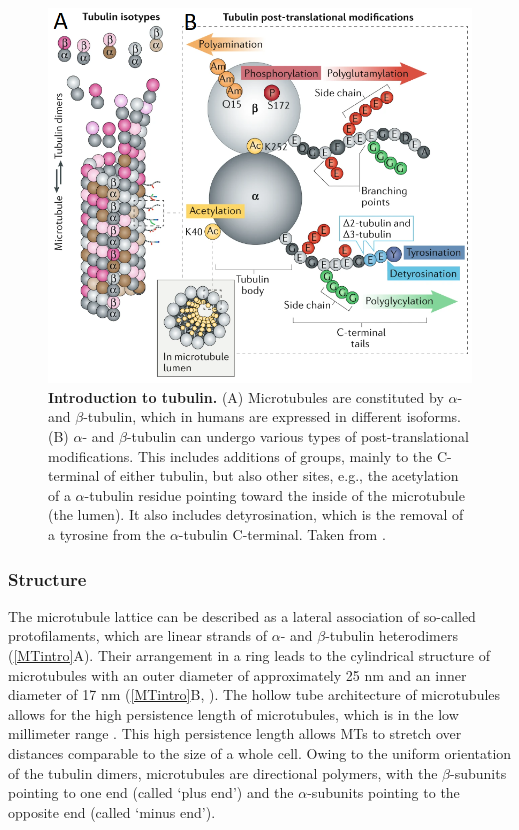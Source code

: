 \begin{figure}[h!tb]
	\centering
	\includegraphics[width=0.6\linewidth]{Figures/tubcode.png}
	\caption[Introduction to tubulin.]{\textbf{Introduction to tubulin.}
	(A) Microtubules are constituted by $\alpha$- and $\beta$-tubulin, which in humans are expressed in different isoforms. (B) $\alpha$- and $\beta$-tubulin can undergo various types of post-translational modifications. This includes additions of groups, mainly to the C-terminal of either tubulin, but also other sites, e.g., the acetylation of a $\alpha$-tubulin residue pointing toward the inside of the microtubule (the lumen). It also includes detyrosination, which is the removal of a tyrosine from the $\alpha$-tubulin C-terminal. Taken from \cite{Janke2020}.
		}\label{tubcode}
\end{figure}

\subsubsection{Structure}
The microtubule lattice can be described as a lateral association of so-called protofilaments, which are linear strands of $\alpha$- and $\beta$-tubulin heterodimers (\autoref{MTintro}A). Their arrangement in a ring leads to the cylindrical structure of microtubules with an outer diameter of approximately 25 nm and an inner diameter of 17 nm (\autoref{MTintro}B, ). The hollow tube architecture of microtubules allows for the high persistence length of microtubules, which is in the low millimeter range \parencite{Hawkins2010}. This high persistence length allows MTs to stretch over distances comparable to the size of a whole cell. Owing to the uniform orientation of the tubulin dimers, microtubules are directional polymers, with the $\beta$-subunits pointing to one end (called ‘plus end’) and the $\alpha$-subunits pointing to the opposite end (called ‘minus end’). \par

